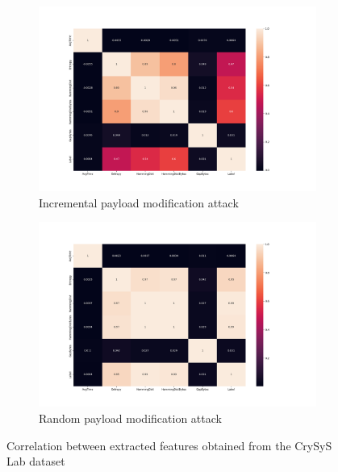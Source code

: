 \begin{figure}
    \centering
    
    \begin{subfigure}[b]{.6\linewidth}
        \centering
        \includegraphics[width = \linewidth]{img/parts/app/feature_correlation/crysys/incr.png}
        \caption{Incremental payload modification attack}
        \label{subfig:apdx_fe_crysys_incr}
    \end{subfigure}
    
    \begin{subfigure}[b]{.6\linewidth}
        \centering
        \includegraphics[width = \linewidth]{img/parts/app/feature_correlation/crysys/random.png}
        \caption{Random payload modification attack}
        \label{subfig:apdx_fe_crysys_random}
    \end{subfigure}
    
    \caption{Correlation between extracted features obtained from the CrySyS Lab dataset}
    \label{fig:apdx_fe_crysys}
\end{figure}

